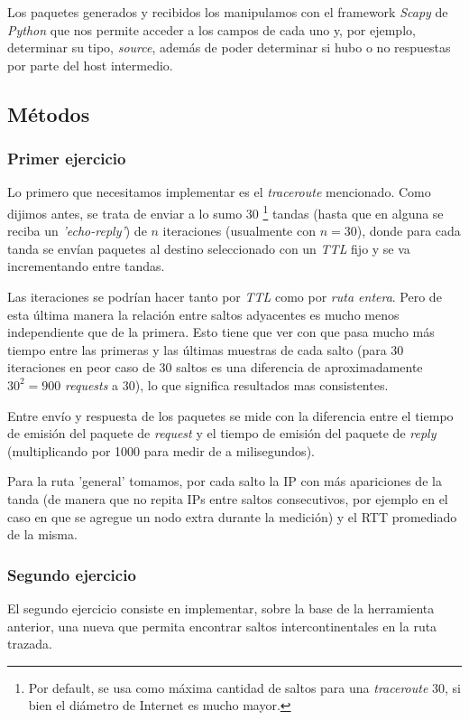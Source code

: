 Los paquetes generados y recibidos los manipulamos con el framework \emph{Scapy} de \emph{Python} que nos permite acceder a los campos de cada uno y, por ejemplo, determinar su tipo, \emph{source}, además de poder determinar si hubo o no respuestas por parte del host intermedio.

\subsection{Métodos}
\subsubsection{Primer ejercicio}

Lo primero que necesitamos implementar es el \emph{traceroute} mencionado. Como dijimos antes, se trata de enviar a lo sumo 30 \footnote{Por default, se usa como máxima cantidad de saltos para una \emph{traceroute} 30, si bien el diámetro de Internet es mucho mayor.} tandas (hasta que en alguna se reciba un \emph{'echo-reply'}) de $n$ iteraciones (usualmente con $n = 30$), donde para cada tanda se envían paquetes al destino seleccionado con un \emph{TTL} fijo y se va incrementando entre tandas.

Las iteraciones se podrían hacer tanto por \emph{TTL} como por \emph{ruta entera}. Pero de esta última manera la relación entre saltos adyacentes es mucho menos independiente que de la primera. Esto tiene que ver con que pasa mucho más tiempo entre las primeras y las últimas muestras de cada salto (para 30 iteraciones en peor caso de 30 saltos es una diferencia de aproximadamente $30^2 = 900$ \emph{requests} a 30), lo que significa resultados mas consistentes. 

Entre envío y respuesta de los paquetes se mide con la diferencia entre el tiempo de emisión del paquete de \emph{request} y el tiempo de emisión del paquete de \emph{reply} (multiplicando por 1000 para medir de a milisegundos).

Para la ruta 'general' tomamos, por cada salto la IP con más apariciones de la tanda (de manera que no repita IPs entre saltos consecutivos, por ejemplo en el caso en que se agregue un nodo extra durante la medición) y el RTT promediado de la misma.

\subsubsection{Segundo ejercicio}

El segundo ejercicio consiste en implementar, sobre la base de la herramienta anterior, una nueva que permita encontrar saltos intercontinentales en la ruta trazada.

